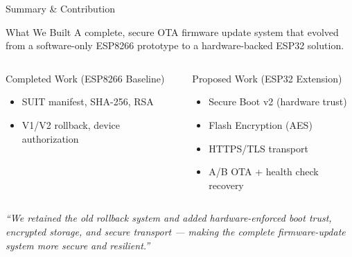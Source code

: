 \documentclass[aspectratio=169]{beamer}
\begin{document}
\begin{frame}{Summary \& Contribution}

\begin{block}{What We Built}
A complete, secure OTA firmware update system that evolved from a software-only ESP8266 prototype to a hardware-backed ESP32 solution.
\end{block}

\vspace{6pt}
\begin{columns}[T]
\begin{block}{Completed Work (ESP8266 Baseline)}
\begin{itemize}\small
  \item SUIT manifest, SHA-256, RSA
  \item V1/V2 rollback, device authorization
\end{itemize}
\end{block}

\begin{block}{Proposed Work (ESP32 Extension)}
\begin{itemize}\small
  \item Secure Boot v2 (hardware trust)
  \item Flash Encryption (AES)
  \item HTTPS/TLS transport
  \item A/B OTA + health check recovery
\end{itemize}
\end{block}
\end{columns}

\vspace{8pt}
\centering
\textit{``We retained the old rollback system and added hardware-enforced boot trust, encrypted storage, and secure transport --- making the complete firmware-update system more secure and resilient.''}

\end{frame}
\end{document}

